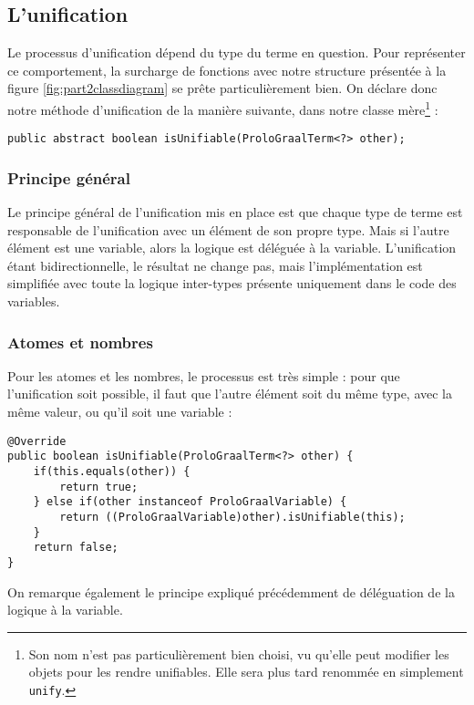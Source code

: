\documentclass[../report.tex]{subfiles}
\begin{document}
\subsection{L'unification}
Le processus d'unification dépend du type du terme en question. Pour représenter ce comportement, la surcharge de fonctions avec notre structure présentée à la figure \ref{fig:part2classdiagram} se prête particulièrement bien. On déclare donc notre méthode d'unification de la manière suivante, dans notre classe mère\footnote{Son nom n'est pas particulièrement bien choisi, vu qu'elle peut modifier les objets pour les rendre unifiables. Elle sera plus tard renommée en simplement \texttt{unify}.} :
\begin{verbatim}
public abstract boolean isUnifiable(ProloGraalTerm<?> other);
\end{verbatim}
\subsubsection{Principe général}
Le principe général de l'unification mis en place est que chaque type de terme est responsable de l'unification avec un élément de son propre type. Mais si l'autre élément est une variable, alors la logique est déléguée à la variable. L'unification étant bidirectionnelle, le résultat ne change pas, mais l'implémentation est simplifiée avec toute la logique inter-types présente uniquement dans le code des variables.
\subsubsection{Atomes et nombres}
Pour les atomes et les nombres, le processus est très simple : pour que l'unification soit possible, il faut que l'autre élément soit du même type, avec la même valeur, ou qu'il soit une variable :
\begin{verbatim}
@Override
public boolean isUnifiable(ProloGraalTerm<?> other) {
    if(this.equals(other)) {
        return true;
    } else if(other instanceof ProloGraalVariable) {
        return ((ProloGraalVariable)other).isUnifiable(this);
    }
    return false;
}
\end{verbatim}
On remarque également le principe expliqué précédemment de déléguation de la logique à la variable.
\end{document}
